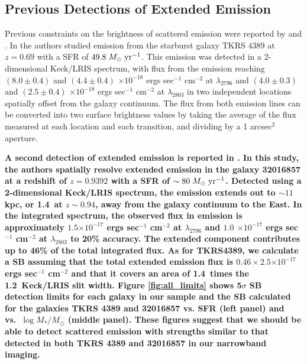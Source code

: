 \documentclass[trackchanges,twocolumn]{aastex62}
\def \msunperyr {{\; M_{\odot}\rm \;yr^{-1}}}
\begin{document}
\subsection{Previous Detections of Extended  Emission}
Previous constraints on the brightness of scattered  emission were reported by \cite{Rubin_2011} and \cite{Martin2013}. In \cite{Rubin_2011} the authors studied emission from the starburst galaxy TKRS 4389 at $z = 0.69$ with a SFR of $49.8\msunperyr$. This emission was detected in a 2-dimensional Keck/LRIS spectrum, with flux from the emission reaching $(8.0 \pm 0.4)$ and $(4.4 \pm 0.4)$ $\times10^{-18}$ ergs sec$^{-1}$ cm$^{-2}$ at  $\lambda _{2796}$ and $(4.0 \pm 0.3)$ and $(2.5 \pm 0.4)$ $\times10^{-18}$ ergs sec$^{-1}$ cm$^{-2}$ at $\lambda_{2803}$ in two independent locations spatially offset from the galaxy continuum. The flux from both emission lines can be converted into two surface brightness values by taking the average of the flux measured at each location and each transition, and dividing by a 1 arcsec$^2$ aperture. 

\textbf{A second detection of extended  emission is reported in \cite{Martin2013}. In this study, the authors spatially resolve extended  emission in the galaxy 32016857 at a redshift of $z=0.9392$ with a SFR of $\sim 80\msunperyr$. Detected using a 2-dimensional Keck/LRIS spectrum, the  emission extends out to $\sim11$ kpc, or 1.4\arcsec\ at $z\sim 0.94$, away from the galaxy continuum to the East. In the integrated spectrum, the observed flux in  emission is approximately $1.5$$\times10^{-17}$ ergs sec$^{-1}$ cm$^{-2}$ at  $\lambda _{2796}$ and $ 1.0$ $\times10^{-17}$ ergs sec$^{-1}$ cm$^{-2}$ at $\lambda_{2803}$ to 20\% accuracy. The extended  component contributes up to 46\% of the total integrated  flux.  As for TKRS4389, we calculate a SB  assuming that the total extended  emission flux is $0.46\times2.5$$\times10^{-17}$ ergs sec$^{-1}$ cm$^{-2}$ and that it covers an area of 1.4\arcsec\ times the 1.2\arcsec\ Keck/LRIS slit width. Figure \ref{fig:all_limits} shows 5$\sigma$ SB detection limits for each galaxy in our sample and the SB calculated for the galaxies TKRS 4389 and 32016857 vs. SFR (left panel) and vs.\ $\log M_*/M_{\odot}$ (middle panel). These figures suggest that we should be able to detect scattered  emission with strengths similar to that detected in both TKRS 4389 and 32016857 in our narrowband imaging.}
\end{document}
